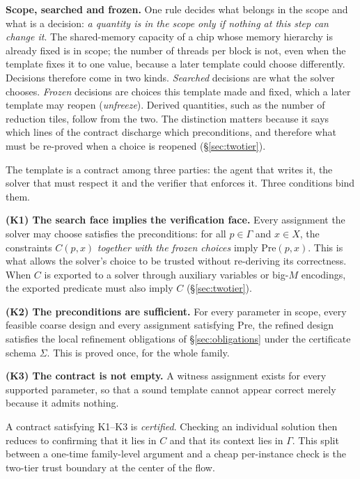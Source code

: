 \documentclass[11pt]{article}
\begin{document}
\textbf{Scope, searched and frozen.} One rule decides what belongs in the scope and what is a decision: \emph{a quantity is in the scope only if nothing at this step can change it}. The shared-memory capacity of a chip whose memory hierarchy is already fixed is in scope; the number of threads per block is not, even when the template fixes it to one value, because a later template could choose differently. Decisions therefore come in two kinds. \emph{Searched} decisions are what the solver chooses. \emph{Frozen} decisions are choices this template made and fixed, which a later template may reopen (\emph{unfreeze}). Derived quantities, such as the number of reduction tiles, follow from the two. The distinction matters because it says which lines of the contract discharge which preconditions, and therefore what must be re-proved when a choice is reopened (§\ref{sec:twotier}).

The template is a contract among three parties: the agent that writes it, the solver that must respect it and the verifier that enforces it. Three conditions bind them.

\textbf{(K1) The search face implies the verification face.} Every assignment the solver may choose satisfies the preconditions: for all \(p\in\Gamma\) and \(x\in X\), the constraints \(C(p,x)\) \emph{together with the frozen choices} imply \(\mathrm{Pre}(p,x)\). This is what allows the solver's choice to be trusted without re-deriving its correctness. When \(C\) is exported to a solver through auxiliary variables or big-\(M\) encodings, the exported predicate must also imply \(C\) (§\ref{sec:twotier}).

\textbf{(K2) The preconditions are sufficient.} For every parameter in scope, every feasible coarse design and every assignment satisfying \(\mathrm{Pre}\), the refined design satisfies the local refinement obligations of §\ref{sec:obligations} under the certificate schema \(\Sigma\). This is proved once, for the whole family.

\textbf{(K3) The contract is not empty.} A witness assignment exists for every supported parameter, so that a sound template cannot appear correct merely because it admits nothing.

A contract satisfying K1--K3 is \emph{certified}. Checking an individual solution then reduces to confirming that it lies in \(C\) and that its context lies in \(\Gamma\). This split between a one-time family-level argument and a cheap per-instance check is the two-tier trust boundary at the center of the flow.
\end{document}
